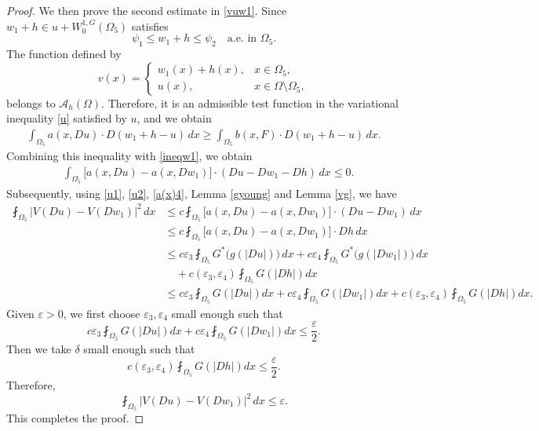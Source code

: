 \documentclass[10pt,a4paper]{article}
\theoremstyle{definition}
\numberwithin{equation}{section}
\begin{document}
\begin{proof}
 	We then prove the second estimate in \eqref{vuw1}.	Since
 $	w_1+h\in u+W_0^{1,G}(\Omega_5)$ satisfies
 \[
 \psi_1\leq w_1+h\leq\psi_2
 \quad\text{a.e. in }\Omega_5.
 \]
 The function defined by
 \[
 v(x)=
 \begin{cases}
 	w_1(x)+h(x), & x\in\Omega_5,\\
 	u(x), & x\in\Omega\setminus\Omega_5,
 \end{cases}
 \]
 belongs to $\mathcal{A}_h(\Omega)$. Therefore, it is an admissible test
 function in the variational inequality \eqref{u} satisfied by $u$, and we obtain
 \begin{align*}
 	\int_{\Omega_5}
 	a(x,Du)\cdot D(w_1+h-u)\,dx
 	\geqslant
 	\int_{\Omega_5}
 	b(x,F)\cdot D(w_1+h-u)\,dx.
 \end{align*}
	Combining this inequality with \eqref{ineqw1},   we   obtain
	\begin{align*}
		&\int_{\Omega_5}
		\bigl[a(x,Du)-a(x,Dw_1)\bigr]
		\cdot(Du-Dw_1-Dh)\,dx
		\leq0.
	\end{align*}
	Subsequently, using \eqref{u1}, \eqref{u2}, \eqref{a(x)4}, Lemma \ref{gyoung} 
	and Lemma \ref{vg}, we have
	\begin{align*}
		\fint_{\Omega_5} |V(Du)-V(Dw_1)|^2\,dx &\leq c\fint_{\Omega_5}
		\bigl[a(x,Du)-a(x,Dw_1)\bigr]
		\cdot(Du-Dw_1)\,dx
		\\
		& \leq c\fint_{\Omega_5}
		\bigl[a(x,Du)-a(x,Dw_1)\bigr]
		\cdot Dh\,dx \\
			& \leq	c\varepsilon_3	\fint_{\Omega_5}
		G^{*}\bigl(g(|Du|)\bigr)\,dx+		c\varepsilon_4	\fint_{\Omega_5}	G^{*}\bigl(g(|Dw_1|)\bigr)\,dx \\
		&\quad +c(\varepsilon_3,\varepsilon_4)	\fint_{\Omega_5}G(|Dh|)dx \\
			& \leq c\varepsilon_3	\fint_{\Omega_5}
			G(|Du|)dx+c\varepsilon_4\fint_{\Omega_5}	G(|Dw_1|)dx+c(\varepsilon_3,\varepsilon_4)	\fint_{\Omega_5}G(|Dh|)dx.
	\end{align*}
	Given $\varepsilon>0$, we first choose $\varepsilon_3,\varepsilon_4$ small enough such that 
	\[ c\varepsilon_3	\fint_{\Omega_5}
	G(|Du|)dx+c\varepsilon_4\fint_{\Omega_5}	G(|Dw_1|)dx \leq \frac{\varepsilon}{2}.
	\]
	Then we take $\delta$ small enough such that 
	\[ c(\varepsilon_3,\varepsilon_4)	\fint_{\Omega_5}G(|Dh|)dx\leq \frac{\varepsilon}{2}.
	\]
Therefore, 
\[ \fint_{\Omega_5} |V(Du)-V(Dw_1)|^2\,dx \leq \varepsilon.
\]
 This completes the proof.
\end{proof}
\end{document}
